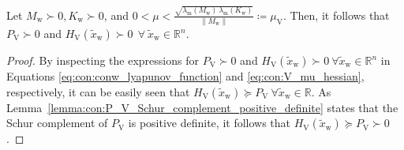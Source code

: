\begin{lemma}\label{lemma:con:P_V_positive_definite}
    Let $M_\mathrm{w} \succ 0, K_\mathrm{w} \succ 0$, and $0 < \mu < \frac{\sqrt{\lambda_\mathrm{m}(M_\mathrm{w}) \, \lambda_\mathrm{m}\left(K_\mathrm{w}\right)}}{\lVert M_\mathrm{w} \rVert} \coloneqq \mu_\mathrm{V}$. Then, it follows that $P_\mathrm{V} \succ 0$ and $H_\mathrm{V}(\tilde{x}_\mathrm{w}) \succ 0 \: \: \forall \: \tilde{x}_\mathrm{w}\in \mathbb{R}^n$.
\end{lemma}
\begin{proof}
    By inspecting the expressions for $P_\mathrm{V} \succ 0$ and $H_\mathrm{V}(\tilde{x}_\mathrm{w}) \succ 0 \: \forall \tilde{x}_\mathrm{w}\in \mathbb{R}^n$ in Equations \eqref{eq:con:conw_lyapunov_function} and \eqref{eq:con:V_mu_hessian}, respectively, it can be easily seen that $H_\mathrm{V}(\tilde{x}_\mathrm{w}) \succeq P_\mathrm{V} \: \forall \tilde{x}_\mathrm{w}\in \mathbb{R}$. As Lemma~\ref{lemma:con:P_V_Schur_complement_positive_definite} states that the Schur complement of $P_\mathrm{V}$ is positive definite, it follows that $H_\mathrm{V}(\tilde{x}_\mathrm{w}) \succeq P_\mathrm{V} \succ 0$.
\end{proof}

